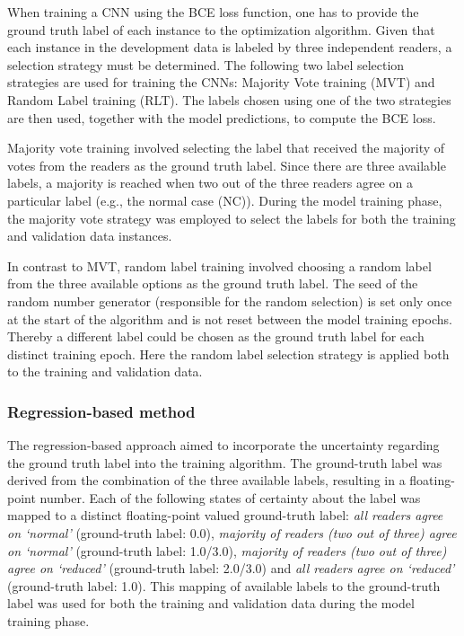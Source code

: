 When training a CNN using the BCE loss function, 
one has to provide the ground truth label of each instance to the optimization algorithm.
Given that each instance in the development data is labeled by three independent readers, 
a selection strategy must be determined.
The following two label selection strategies are used for training the CNNs: 
Majority Vote training (MVT) and Random Label training (RLT).
The labels chosen using one of the two strategies are then used, together with the model predictions, 
to compute the BCE loss.

Majority vote training involved selecting the label that received the majority of votes from the readers as the 
ground truth label.
Since there are three available labels, 
a majority is reached when two out of the three readers agree on a particular label (e.g., the normal case (NC)).
During the model training phase, the majority vote strategy was employed to select the labels for both the training 
and validation data instances.

In contrast to MVT, random label training involved choosing a random label from the three available options
as the ground truth label.
The seed of the random number generator (responsible for the random selection) is set only once at the start of the
algorithm and is not reset between the model training epochs.
Thereby a different label could be chosen as the ground truth label for each distinct training epoch.
Here the random label selection strategy is applied both to the training and validation data.

\subsubsection{Regression-based method}
\label{subsubsec:cnn_based_classification_regression}

The regression-based approach aimed to incorporate the uncertainty regarding the ground truth label 
into the training algorithm.
The ground-truth label was derived from the combination of the three available labels, 
resulting in a floating-point number.
Each of the following states of certainty about the label was mapped to a distinct 
floating-point valued ground-truth label: 
\emph{all readers agree on `normal' } (ground-truth label: 0.0), 
\emph{majority of readers (two out of three) agree on `normal'} (ground-truth label: 1.0/3.0), 
\emph{majority of readers (two out of three) agree on `reduced'} (ground-truth label: 2.0/3.0) 
and \emph{all readers agree on `reduced'} (ground-truth label: 1.0).
This mapping of available labels to the ground-truth label was used for both the training 
and validation data during the model training phase.

